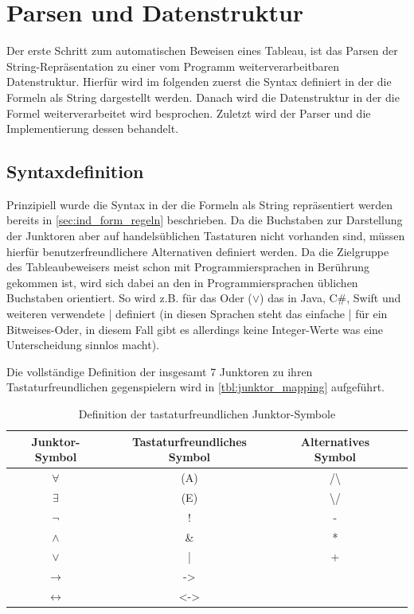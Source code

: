 
\chapter{Parsen und Datenstruktur}
Der erste Schritt zum automatischen Beweisen eines Tableau, ist das Parsen der String-Repräsentation zu einer vom Programm weiterverarbeitbaren Datenstruktur. Hierfür wird im folgenden zuerst die Syntax definiert in der die Formeln als String dargestellt werden. Danach wird die Datenstruktur in der die Formel weiterverarbeitet wird besprochen. Zuletzt wird der Parser und die Implementierung dessen behandelt.

\section{Syntaxdefinition}
Prinzipiell wurde die Syntax in der die Formeln als String repräsentiert werden bereits in \autoref{sec:ind_form_regeln} beschrieben. Da die Buchstaben zur Darstellung der Junktoren aber auf handelsüblichen Tastaturen nicht vorhanden sind, müssen hierfür benutzerfreundlichere Alternativen definiert werden. Da die Zielgruppe des Tableaubeweisers meist schon mit Programmiersprachen in Berührung gekommen ist, wird sich dabei an den in Programmiersprachen üblichen Buchstaben orientiert. So wird z.B. für das Oder ($\vee$) das in Java, C\#, Swift und weiteren verwendete | definiert (in diesen Sprachen steht das einfache | für ein Bitweises-Oder, in diesem Fall gibt es allerdings keine Integer-Werte was eine Unterscheidung sinnlos macht).

Die vollständige Definition der insgesamt 7 Junktoren zu ihren Tastaturfreundlichen gegenspielern wird in \autoref{tbl:junktor_mapping} aufgeführt.
\begin{table}[h]
\begin{center}
\begin{tabular}{|c|c|c|c|}
\hline
Junktor-Symbol & Tastaturfreundliches Symbol & Alternatives Symbol \\
\hline
$\forall$ & (A) & /\textbackslash \\
\hline
$\exists$ & (E) & \textbackslash/ \\
\hline
$\neg$ & ! & - \\
\hline
$\wedge$ & \& & * \\
\hline
$\vee$ & | & + \\
\hline
$\rightarrow$ & -> & \\
\hline
$\leftrightarrow$ & <-> & \\
\hline
\end{tabular}
\end{center}
\caption{\label{tbl:junktor_mapping}Definition der tastaturfreundlichen Junktor-Symbole}
\end{table}

